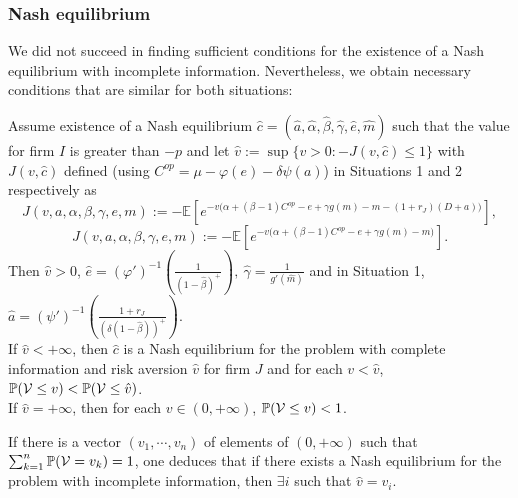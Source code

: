 \documentclass{svjour3}
\begin{document}
\subsubsection{Nash equilibrium}
We did not succeed in finding sufficient conditions for the existence of  a Nash equilibrium with incomplete information. Nevertheless, we obtain necessary conditions that are similar for both situations:

\begin{theorem}
\label{prop:Nashincomplet}
Assume existence of a Nash equilibrium $\hat{c}=(\hat{a},\hat{\alpha},\hat{\beta},\hat{\gamma},\hat{e},\hat{m})$ such that the value for firm $I$ is greater than $-p$ and let
$\hat v:=\sup\{v>0:-J(v,\hat{c})\leq 1\}$
with $J(v,\hat{c}) $  defined (using $C^{op}=\mu-\varphi(e)-\delta\psi(a)$) in Situations 1 and  2 respectively as
$$J(v,a,\alpha,\beta,\gamma,e,m):=-\mathbb{E}\left[ e^{-v\big(\alpha+(\beta-1)C^{op}-e+\gamma{g}(m)-m -(1+r_J)(D+ a)\big)}\right],$$
$$J(v,a,\alpha,\beta,\gamma,e,m):=-\mathbb{E}\left[e^{-v\big(\alpha+(\beta-1)C^{op}-e+\gamma{g}(m)-m\big)}\right].$$
 Then $\hat v>0$,
$\hat e=(\varphi')^{-1}\left(\frac{1}{(1-\hat \beta)^+}\right),~\hat \gamma = \frac{1}{g'(\hat m)}$ and in Situation 1, 
$\hat a=(\psi')^{-1}\left(\frac{1+r_J}{(\delta(1-\hat\beta))^+ }\right)$. 
\\
If $\hat v<+\infty$, then $\hat{c}$ is a Nash equilibrium for the problem with complete information and risk aversion $\hat v$ for firm $J$ and for each $v<\hat v$, ${\mathbb{P}}({\cal V}\leq v)<{\mathbb{P}}({\cal V}\leq \hat v)$. 
\\
If $\hat v=+\infty$, then for each $v\in (0,+\infty)$, ${\mathbb{P}}({\cal V}\leq v)<1$.
\end{theorem}
\begin{remark}
   If there is a vector $(v_1,\cdots,v_n)$ of elements of $(0,+\infty)$ such that 
   \\
   $\sum_{k=1}^n{\mathbb{P}}({\cal V}=v_k)=1$, one deduces that if there exists a  Nash equilibrium for the problem with incomplete information, then $\exists i$ such that $\hat v=v_i$.
\end{remark}
\end{document}
